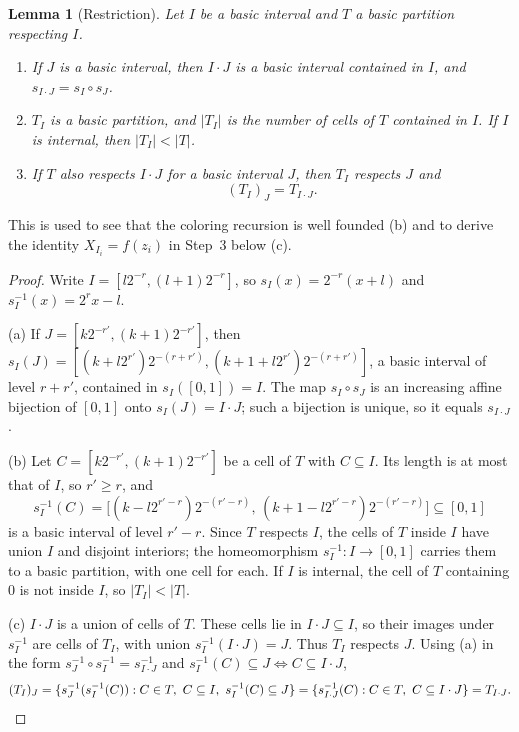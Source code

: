 \documentclass[11pt]{article}
\newtheorem{lemma}[theorem]{Lemma}
\theoremstyle{definition}
\numberwithin{equation}{section}
\begin{document}
\begin{lemma}[Restriction]\label{dyad:restrict}
Let \(I\) be a basic interval and \(T\) a basic partition respecting \(I\).
\begin{enumerate}[label=(\alph*)]
\item If \(J\) is a basic interval, then \(I\cdot J\) is a basic interval
contained in \(I\), and \(s_{I\cdot J}=s_I\circ s_J\).
\item \(T_I\) is a basic partition, and \(|T_I|\) is the number of cells of
\(T\) contained in \(I\). If \(I\) is internal, then \(|T_I|<|T|\).
\item If \(T\) also respects \(I\cdot J\) for a basic interval \(J\), then
\(T_I\) respects \(J\) and
\begin{equation}\label{dyad:restriction}
  (T_I)_J=T_{I\cdot J}.
\end{equation}
\end{enumerate}
\end{lemma}
This is used to see that the coloring recursion is well founded (b) and to
derive the identity \(X_{I_i}=f(z_i)\) in Step~3 below (c).

\begin{proof}
Write \(I=[l2^{-r},(l+1)2^{-r}]\), so \(s_I(x)=2^{-r}(x+l)\) and
\(s_I^{-1}(x)=2^rx-l\).

(a) If \(J=[k2^{-r'},(k+1)2^{-r'}]\), then
\(s_I(J)=[(k+l2^{r'})2^{-(r+r')},(k+1+l2^{r'})2^{-(r+r')}]\), a basic
interval of level \(r+r'\), contained in \(s_I([0,1])=I\). The map
\(s_I\circ s_J\) is an increasing affine bijection of \([0,1]\) onto
\(s_I(J)=I\cdot J\); such a bijection is unique, so it equals
\(s_{I\cdot J}\).

(b) Let \(C=[k2^{-r'},(k+1)2^{-r'}]\) be a cell of \(T\) with
\(C\subseteq I\). Its length is at most that of \(I\), so \(r'\ge r\), and
\[
 s_I^{-1}(C)=\bigl[(k-l2^{r'-r})2^{-(r'-r)},\,(k+1-l2^{r'-r})2^{-(r'-r)}\bigr]
 \subseteq[0,1]
\]
is a basic interval of level \(r'-r\). Since \(T\) respects \(I\), the cells
of \(T\) inside \(I\) have union \(I\) and disjoint interiors; the
homeomorphism \(s_I^{-1}:I\to[0,1]\) carries them to a basic partition, with
one cell for each. If \(I\) is internal, the cell of \(T\) containing \(0\)
is not inside \(I\), so \(|T_I|<|T|\).

(c) \(I\cdot J\) is a union of cells of \(T\). These cells lie in
\(I\cdot J\subseteq I\), so their images under \(s_I^{-1}\) are cells of
\(T_I\), with union \(s_I^{-1}(I\cdot J)=J\). Thus \(T_I\) respects \(J\).
Using (a) in the form \(s_J^{-1}\circ s_I^{-1}=s_{I\cdot J}^{-1}\) and
\(s_I^{-1}(C)\subseteq J\iff C\subseteq I\cdot J\),
\[
 (T_I)_J=\{s_J^{-1}(s_I^{-1}(C)):C\in T,\ C\subseteq I,\ s_I^{-1}(C)\subseteq J\}
 =\{s_{I\cdot J}^{-1}(C):C\in T,\ C\subseteq I\cdot J\}=T_{I\cdot J}.
 \qedhere
\]
\end{proof}
\end{document}
